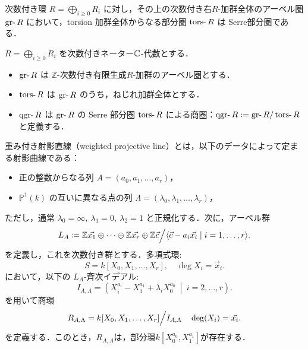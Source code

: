 \begin{prop}
次数付き環 \( R = \bigoplus_{i \ge 0} R_i \) に対し，その上の次数付き右$R$-加群全体のアーベル圏 \(\gr R\) において，torsion 加群全体からなる部分圏 \(\tors R\) は Serre部分圏である．
\end{prop}

\begin{defn}\cite{AZ94}
\(
R = \bigoplus_{i \ge 0} R_i
\) を次数付きネーター${\mathbb C}$-代数とする．\vspace{-3mm}
\begin{itemize}
  \item $\gr R$ は $\mathbb{Z}$-次数付き有限生成$R$-加群のアーベル圏とする．
  \item $\tors R$ は $\gr R$ のうち，ねじれ加群全体とする．
  \item $\qgr R$ は $\gr R$ の Serre 部分圏 $\tors R$ による商圏：$\qgr R := \gr R / \tors R$ と定義する．
\end{itemize}
\end{defn}

\begin{defn}\cite{GL87}
重み付き射影直線（weighted projective line）とは，以下のデータによって定まる射影曲線である：

\begin{itemize}
  \item 正の整数からなる列 $A = (a_0, a_1, \dots, a_r)$，
  \item $\mathbb{P}^1(k)$ の互いに異なる点の列 $\Lambda = (\lambda_0, \lambda_1, \dots, \lambda_r)$，
\end{itemize}

ただし，通常 $\lambda_0 = \infty,\ \lambda_1 = 0,\ \lambda_2 = 1$ と正規化する．次に，アーベル群
\[
	L_{A} \coloneq {\mathbb Z} \vec{x_1}\oplus\cdots\oplus{\mathbb Z} \vec{x_r}\oplus {\mathbb Z}\vec{c}\Big{/}\langle\vec{c} -a_i\vec{x_i}\mid i=1,\ldots,r\rangle.
\]
を定義し，これを次数付き群とする．多項式環: 
\[
	S = k[X_0, X_1, \dots, X_r], \quad \deg X_i = \vec{x}_i. 
\]
において，以下の $L_A$-斉次イデアル:
\[
	I_{A,\Lambda} = \left( X_i^{a_i} - X_1^{a_1} + \lambda_i X_0^{a_0} \ \middle|\ i = 2, \dots, r \right).
\]
を用いて商環
\[
	R_{A,\Lambda} = k[X_0, X_1, \dots, X_r]\Big{/}I_{A,\Lambda} \quad \deg(X_i)=\vec{x_i}.
\]
を定義する．このとき，$R_{A,\Lambda}$は，部分環$k[X_0^{a_0},X_1^{a_1}]$が存在する．
\end{defn}

